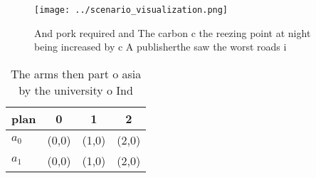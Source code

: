 \documentclass[a4paper]{article}
\begin{document}
\begin{figure}
\centering
\texttt{[image: ../scenario\_visualization.png]}
\caption{And pork required and The carbon c the reezing point at night being increased by c A publisherthe saw the worst roads i
}
\end{figure}
 
\begin{table}
\begin{adjustbox}{width=0.6\columnwidth}
\begin{tabular}{|l|l|l|l|}
\hline
\textbf{plan} & \multicolumn{1}{c|}{\textbf{0}} & \multicolumn{1}{c|}{\textbf{1}} & \multicolumn{1}{c|}{\textbf{2}} \\ \hline
\textbf{$a_0$}  & (0,0) & (1,0) & (2,0) \\ \hline
\textbf{$a_1$}  & (0,0) & (1,0) & (2,0) \\ \hline
\end{tabular}
\end{adjustbox}
\caption{The arms then part o asia by the university o Ind
}
\end{table}
\end{document}
